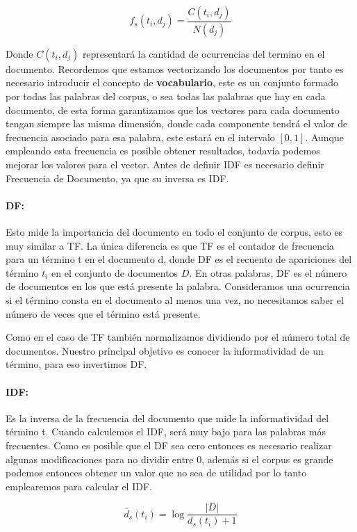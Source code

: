 \documentclass[runningheads,a4paper]{llncs}
\begin{document}
\begin{equation}
	f_s(t_i, d_j) = \frac{C(t_i, d_j)}{N(d_j)}
\end{equation}

Donde $C(t_i, d_j)$ representará la cantidad de ocurrencias del termino en el documento. Recordemos que estamos vectorizando los documentos por tanto es necesario introducir el concepto de \textbf{vocabulario}, este es un conjunto formado por todas las palabras del corpus, o sea todas las palabras que hay en cada documento, de esta forma garantizamos que los vectores para cada documento tengan siempre las misma dimensión, donde cada componente tendrá el valor de frecuencia asociado para esa palabra, este estará en el intervalo $[0,1]$. Aunque empleando esta frecuencia es posible obtener resultados, todavía podemos mejorar los valores para el vector. Antes de definir IDF es necesario definir Frecuencia de Documento, ya que su inversa es IDF.

\paragraph*{DF:} Esto mide la importancia del documento en todo el conjunto de corpus, esto es muy similar a TF. La única diferencia es que TF es el contador de frecuencia para un término t en el documento d, donde DF es el recuento de apariciones del término $t_i$ en el conjunto de documentos $D$. En otras palabras, DF es el número de documentos en los que está presente la palabra. Consideramos una ocurrencia si el término consta en el documento al menos una vez, no necesitamos saber el número de veces que el término está presente. 

Como en el caso de TF también normalizamos dividiendo por el número total de documentos. Nuestro principal objetivo es conocer la informatividad de un término, para eso invertimos DF.

\paragraph*{IDF:} Es la inversa de la frecuencia del documento que mide la informatividad del término t. Cuando calculemos el IDF, será muy bajo para las palabras más frecuentes. Como es posible que el DF sea cero entonces es necesario realizar algunas modificaciones para no dividir entre 0, además si el corpus es grande podemos entonces obtener un valor que no sea de utilidad por lo tanto emplearemos para calcular el IDF.

\begin{equation}
	\overline{d}_s(t_i) = \log{\frac{|D|}{d_s(t_i) + 1}}
\end{equation}
\end{document}
